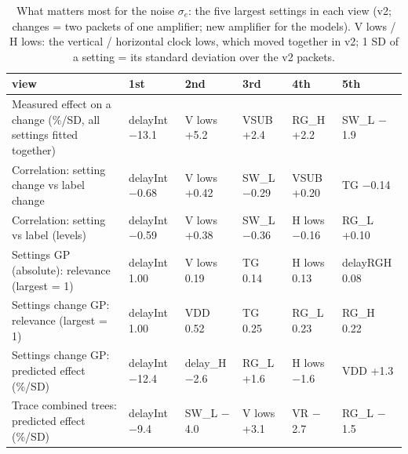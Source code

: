 \begin{table}[H]\centering\small
\caption{What matters most for the noise $\sigma_e$: the five largest settings in each view (v2; changes = two packets of one amplifier; new amplifier for the models). V lows / H lows: the vertical / horizontal clock lows, which moved together in v2; 1 SD of a setting = its standard deviation over the v2 packets.}
\begin{tabular}{p{5.2cm}lllll}\toprule
view & 1st & 2nd & 3rd & 4th & 5th\\\midrule
Measured effect on a change (\%/SD, all settings fitted together) & delayInt $-$13.1 & V lows +5.2 & VSUB +2.4 & RG\_H +2.2 & SW\_L $-$1.9\\
Correlation: setting change vs label change & delayInt $-$0.68 & V lows +0.42 & SW\_L $-$0.29 & VSUB +0.20 & TG $-$0.14\\
Correlation: setting vs label (levels) & delayInt $-$0.59 & V lows +0.38 & SW\_L $-$0.36 & H lows $-$0.16 & RG\_L +0.10\\
Settings GP (absolute): relevance (largest = 1) & delayInt 1.00 & V lows 0.19 & TG 0.14 & H lows 0.13 & delayRGH 0.08\\
Settings change GP: relevance (largest = 1) & delayInt 1.00 & VDD 0.52 & TG 0.25 & RG\_L 0.23 & RG\_H 0.22\\
Settings change GP: predicted effect (\%/SD) & delayInt $-$12.4 & delay\_H $-$2.6 & RG\_L +1.6 & H lows $-$1.6 & VDD +1.3\\
Trace combined trees: predicted effect (\%/SD) & delayInt $-$9.4 & SW\_L $-$4.0 & V lows +3.1 & VR $-$2.7 & RG\_L $-$1.5\\
\bottomrule\end{tabular}\end{table}

